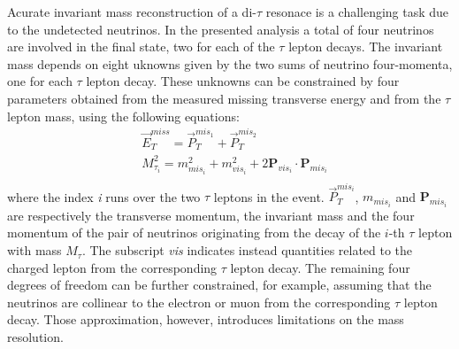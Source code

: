 Acurate invariant mass reconstruction of a di-$\tau$ resonace is a challenging task due to the undetected neutrinos. 
In the presented analysis a total of four neutrinos are involved in the final state, two for each 
of the $\tau$ lepton decays.
The invariant mass depends on eight uknowns given by the two
sums of neutrino four-momenta, one for each $\tau$ lepton decay. These unknowns can be constrained by four parameters 
obtained from the measured  missing transverse energy and from the $\tau$ lepton mass, using the following equations:
% 
\begin{equation} \label{eq:MMC}
\begin{split}
&\vec{E}_T^{miss} = \vec{P}_{T}^{mis_{1}} +  \vec{P}_{T}^{mis_2} \\
&M_{\tau_{i}}^2 = m^2_{mis_{i}} + m^2_{vis_{i}} + 2 \mathbf{P}_{vis_i} \cdot \mathbf{P}_{mis_i} \\
\end{split}
\end{equation}
where the index \emph{i} runs over the two $\tau$ leptons in the event. 
$\vec{P}_{T}^{mis_{i}}$, $m_{mis_{i}}$ and $\mathbf{P}_{mis_{i}}$ are respectively the transverse momentum, the invariant mass and 
the four momentum of the pair of neutrinos originating from the decay of the $i$-th  $\tau$ 
lepton with mass $M_{\tau}$. The subscript \emph{vis} indicates instead 
quantities related to the charged lepton from  the corresponding $\tau$ lepton decay. The remaining four degrees of freedom can be 
further constrained, for example, assuming that the neutrinos are collinear to the electron or muon from the corresponding 
$\tau$ lepton decay. Those approximation, however, introduces limitations on the mass resolution.

